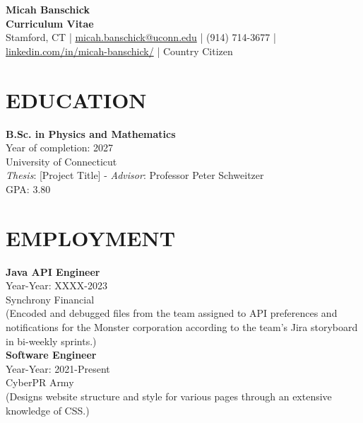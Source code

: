 \documentclass[a4paper,9pt]{extarticle}
\begin{document}
\pagestyle{empty}

\begin{center}
\textbf{\Large Micah Banschick }\\[3pt] %
\textbf{Curriculum Vitae}\\[1pt] %
Stamford, CT | \href{mailto:micah.banschick@uconn.edu}{micah.banschick@uconn.edu} | (914) 714-3677 | \href{https://www.linkedin.com/in/micah-banschick/}{linkedin.com/in/micah-banschick/} | Country Citizen %
\end{center}


\section*{EDUCATION}

\noindent
\newline
\textbf{B.Sc. in Physics and Mathematics} \\
Year of completion: 2027 \\ 
University of Connecticut \\ 
\textit{Thesis}: [Project Title] - \textit{Advisor}: Professor Peter Schweitzer \\
GPA: 3.80 \\


\section*{EMPLOYMENT}
\noindent
\newline
\textbf{Java API Engineer} \\
Year-Year: XXXX-2023 \\
Synchrony Financial \\ 
(Encoded and debugged files from the team assigned to API preferences and notifications for the Monster corporation according to the team’s Jira storyboard in bi-weekly sprints.) \\ 

\noindent
\textbf{Software Engineer} \\
Year-Year: 2021-Present \\
CyberPR Army \\ 
(Designs website structure and style for various pages through an extensive knowledge of CSS.) \\
\end{document}
